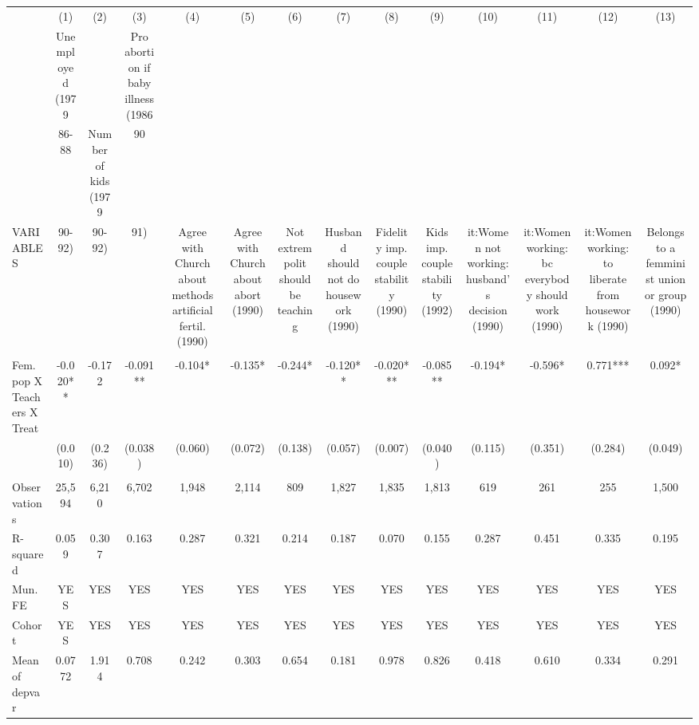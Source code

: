 \begin{tabular}{lccccccccccccc} \hline
 & (1) & (2) & (3) & (4) & (5) & (6) & (7) & (8) & (9) & (10) & (11) & (12) & (13) \\
 & Unemployed (1979 &  & Pro abortion if baby illness (1986 &  &  &  &  &  &  &  &  &  &  \\
 & 86-88 & Number of kids (1979 & 90 &  &  &  &  &  &  &  &  &  &  \\
VARIABLES & 90-92) & 90-92) & 91) & Agree with Church about methods artificial fertil. (1990) & Agree with Church about abort (1990) & Not extrem polit should be teaching & Husband should not do housework (1990) & Fidelity imp. couple stability (1990) & Kids imp. couple stability (1992) & {it:Women not working:} husband's decision (1990) & {it:Women working:} bc everybody should work (1990) & {it:Women working:} to liberate from housework (1990) & Belongs to a femminist union or group (1990) \\ \hline
 &  &  &  &  &  &  &  &  &  &  &  &  &  \\
Fem. pop X Teachers X Treat & -0.020** & -0.172 & -0.091** & -0.104* & -0.135* & -0.244* & -0.120** & -0.020*** & -0.085** & -0.194* & -0.596* & 0.771*** & 0.092* \\
 & (0.010) & (0.236) & (0.038) & (0.060) & (0.072) & (0.138) & (0.057) & (0.007) & (0.040) & (0.115) & (0.351) & (0.284) & (0.049) \\
 &  &  &  &  &  &  &  &  &  &  &  &  &  \\
Observations & 25,594 & 6,210 & 6,702 & 1,948 & 2,114 & 809 & 1,827 & 1,835 & 1,813 & 619 & 261 & 255 & 1,500 \\
R-squared & 0.059 & 0.307 & 0.163 & 0.287 & 0.321 & 0.214 & 0.187 & 0.070 & 0.155 & 0.287 & 0.451 & 0.335 & 0.195 \\
Mun. FE & YES & YES & YES & YES & YES & YES & YES & YES & YES & YES & YES & YES & YES \\
Cohort & YES & YES & YES & YES & YES & YES & YES & YES & YES & YES & YES & YES & YES \\
 Mean of depvar & 0.0772 & 1.914 & 0.708 & 0.242 & 0.303 & 0.654 & 0.181 & 0.978 & 0.826 & 0.418 & 0.610 & 0.334 & 0.291 \\ \hline
\end{tabular}
